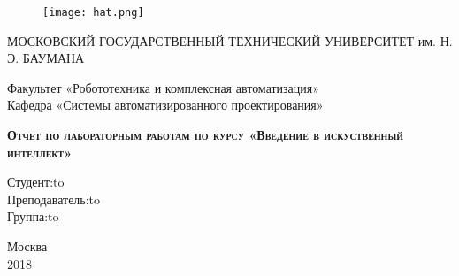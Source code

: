 \begin{titlepage}
\newpage

\begin{figure}[!htb]
\centering
\texttt{[image: hat.png]}
\end{figure}

\begin{center}
МОСКОВСКИЙ ГОСУДАРСТВЕННЫЙ ТЕХНИЧЕСКИЙ
УНИВЕРСИТЕТ им. Н. Э. БАУМАНА \\
\end{center}

\vspace{6em}

\begin{center}
\Large Факультет «Робототехника и комплексная автоматизация» \\
\Large Кафедра «Системы автоматизированного проектирования» \\ 
\end{center}

\vspace{2em}

\begin{center}
\textsc{\textbf{Отчет по лабораторным работам по курсу
 \linebreak «Введение в искуственный интеллект»}}
\end{center}

\vspace{16em}



\newbox{\lbox}
\newlength{\maxl}
\setlength{\maxl}{\wd\lbox}
\hfill\parbox{11cm}{
\hspace*{5cm}\hspace*{-2cm}Студент:\hfill\hbox to\\
\hspace*{5cm}\hspace*{-2cm}Преподаватель:\hfill\hbox to\\
\hspace*{5cm}\hspace*{-2cm}Группа:\hfill\hbox to\\
}


\vspace{\fill}

\begin{center}
Москва \\2018
\end{center}

\end{titlepage}
